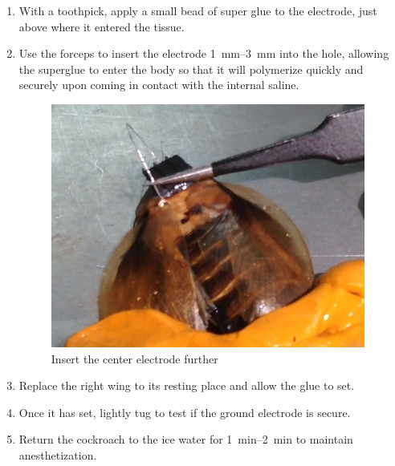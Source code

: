 \begin{enumerate}
\item  With a toothpick, apply a small bead of super glue to the electrode, just above where it entered the tissue.
\item Use the forceps to insert the electrode \SIrange{1}{3}{\milli\meter} into the hole, allowing the superglue to enter the body so that it will polymerize quickly and securely upon coming in contact with the internal saline.
{\begin{figure}[ht!]
\centering
\includegraphics[scale=0.4]{Surgery Photos/celectrode2.jpg}
\caption{Insert the center electrode further}
\label{fig:celectrode2}
\end{figure}}
\item Replace the right wing to its resting place and allow the glue to set.
\item Once it has set, lightly tug to test if the ground electrode is secure.
\item Return the cockroach to the ice water for \SIrange{1}{2}{\minute} to maintain anesthetization.
\end{enumerate}










